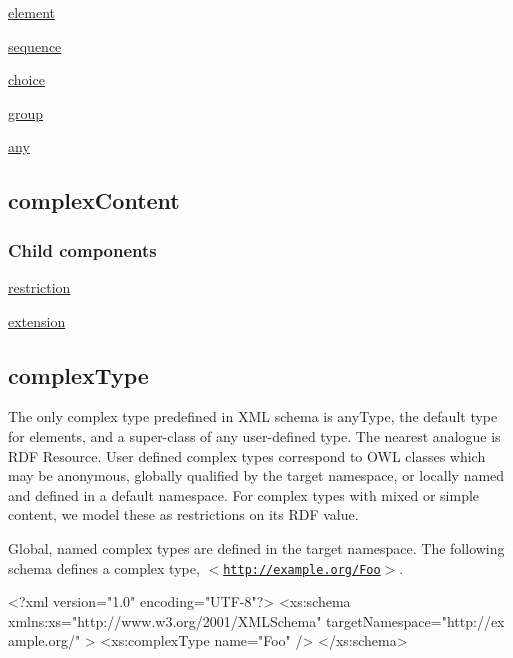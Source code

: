 \begin{DoxyItemize}
\item \hyperlink{element}{element}
\item \hyperlink{sequence}{sequence}
\item \hyperlink{choice}{choice}
\item \hyperlink{group}{group}
\item \hyperlink{any}{any} 
\end{DoxyItemize}\hypertarget{complexContent}{}\subsection{complexContent}\label{complexContent}
\hypertarget{element_elementChildren}{}\subsubsection{Child components}\label{element_elementChildren}

\begin{DoxyItemize}
\item \hyperlink{restriction}{restriction}
\item \hyperlink{extension}{extension} 
\end{DoxyItemize}\hypertarget{complexType}{}\subsection{complexType}\label{complexType}
The only complex type predefined in XML schema is anyType, the default type for elements, and a super-\/class of any user-\/defined type. The nearest analogue is RDF Resource. User defined complex types correspond to OWL classes which may be anonymous, globally qualified by the target namespace, or locally named and defined in a default namespace. For complex types with mixed or simple content, we model these as restrictions on its RDF value.

Global, named complex types are defined in the target namespace. The following schema defines a complex type, $<$\href{http://example.org/Foo}{\tt http://example.org/Foo}$>$.


\begin{DoxyCodeInclude}
<?xml version="1.0" encoding="UTF-8"?>
<xs:schema xmlns:xs="http://www.w3.org/2001/XMLSchema" targetNamespace="http://ex
      ample.org/" >
        <xs:complexType name="Foo" />
</xs:schema>
\end{DoxyCodeInclude}
 
